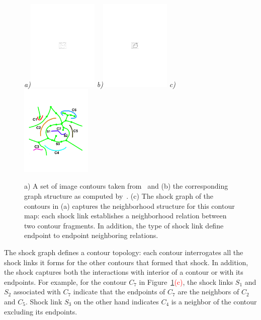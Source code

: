 \begin{figure}[ht]
\centering
{\footnotesize\textit{a)}}\includegraphics[width=0.3\textwidth]{figs/random_curves.pdf}
{\footnotesize\textit{b)}}\includegraphics[width=0.3\textwidth]{figs/random_curves_ng.pdf}
{\footnotesize\textit{c)}}\includegraphics[width=0.3\textwidth]{figs/shock_structure_random_curves.pdf}
\caption{a) A set of image contours taken from~\cite{Wang:etal:PAMI05} and (b) the corresponding graph structure as computed by~\cite{Wang:etal:PAMI05}. (c) The shock graph of the contours in (a) captures the neighborhood structure for this contour map: each shock link establishes a neighborhood relation between two contour fragments. In addition, the type of shock link define endpoint to endpoint neighboring relations. }
\label{fig:curve_ng}
\end{figure}

The shock graph defines a contour topology: each contour interrogates all the shock links it forms for the other contours that formed that shock. In addition, the shock captures both the interactions with interior of a contour or with its endpoints. For example, for the contour $C_7$ in Figure~\ref{fig:curve_ng}\textcolor{red}{(c)}, the shock links $S_1$ and $S_2$ associated with $C_7$ indicate that the endpoints of $C_7$ are the neighbors of $C_2$ and $C_5$. Shock link $S_3$ on the other hand indicates $C_4$ is a neighbor of the contour excluding its endpoints. %

